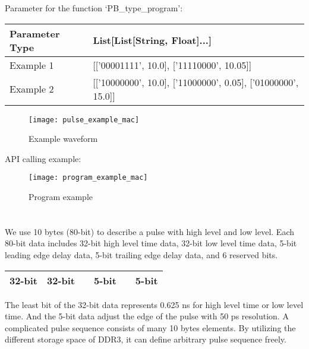 Parameter for the function `PB\_type\_program':

\vspace{0.2cm}
\begin{table}[H]
\normalsize
\begin{tabular}{|m{6.5cm}<{\centering}|m{7cm}<{\centering}|}
\hline Parameter Type & List[List[String, Float]...]
\\ 
\hline Example 1 & [['00001111', 10.0], ['11110000', 10.05]] 
\\ 
\hline Example 2 & [['10000000', 10.0], ['11000000', 0.05], ['01000000', 15.0]] \\\hline
\end{tabular}
\end{table}

\begin{figure}[ht]
\centering
\texttt{[image: pulse\_example\_mac]}
\caption{Example waveform}
\label{pulse_example_mac}
\end{figure}

\indent API calling example:

\begin{figure}[ht]
\centering
\texttt{[image: program\_example\_mac]}
\caption{Program example}
\label{program_example_mac}
\end{figure}


\section{}
\indent We use 10 bytes (80-bit) to describe a pulse with high level and low level. Each 80-bit data includes 32-bit high level time data, 32-bit low level time data, 5-bit leading edge delay data, 5-bit trailing edge delay data, and 6 reserved bits. 

\begin{table}[H]
\centering
\normalsize
\begin{tabular}{|m{3.5cm}|m{3.5cm}|m{0.5cm}|m{1cm}|m{0.5cm}|m{1cm}|}
\hline 32-bit & 32-bit & \qquad & 5-bit & \qquad & 5-bit \\\hline
\end{tabular}
\end{table}

\indent The least bit of the 32-bit data represents 0.625 ns for high level time or low level time. And the 5-bit data adjust the edge of the pulse with 50 ps resolution.
\indent A complicated pulse sequence consists of many 10 bytes elements. By utilizing the different storage space of DDR3, it can define arbitrary pulse sequence freely.